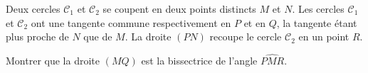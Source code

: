 \documentclass[varwidth]{standalone}
\begin{document}
    Deux cercles $\mathcal{C}_1$ et $\mathcal{C}_2$ se coupent en deux points distincts $M$ et $N$. Les cercles $\mathcal{C}_1$ et $\mathcal{C}_2$ ont une tangente commune respectivement en $P$ et en $Q$, la tangente \'etant plus proche de $N$ que de $M$. La droite $(PN)$ recoupe le cercle $\mathcal{C}_2$ en un point $R$.

    Montrer que la droite $(MQ)$ est la bissectrice de l'angle $\widehat{PMR}$.
\end{document}

